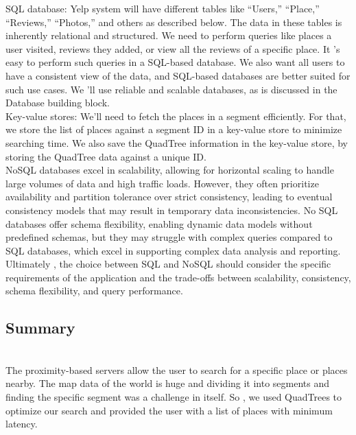 SQL database: Yelp system will have different tables like ``Users,'' ``Place,'' ``Reviews,'' ``Photos,'' and others as described below. The data in these tables is inherently relational and structured. We need to perform queries like places a user visited, reviews they added, or view all the reviews of a specific place. It 's easy to perform such queries in a SQL-based database. We also want all users to have a consistent view of the data, and SQL-based databases are better suited for such use cases. We
'll use reliable and scalable databases, as is discussed in the Database building block.
\\
Key-value stores: We'll need to fetch the places in a segment efficiently. For that, we store the list of places against a segment ID in a key-value store to minimize searching time. We also save the QuadTree information in the key-value store, by storing the QuadTree data against a unique ID.
\\
NoSQL databases excel in scalability, allowing for horizontal scaling to handle large volumes of data and high traffic loads. However, they often prioritize availability and partition tolerance over strict consistency, leading to eventual consistency models that may result in temporary data inconsistencies. No SQL databases offer schema flexibility, enabling dynamic data models without predefined schemas, but they may struggle with complex queries compared to SQL databases, which excel in supporting complex data analysis and reporting. Ultimately
, the choice between SQL and NoSQL should consider the specific requirements of the application and the trade-offs between scalability, consistency, schema flexibility, and query performance.

\subsection{Summary}\label{e6L3XN3URCeSjwSeu98Dn}
\\
The proximity-based servers allow the user to search for a specific place or places nearby. The map data of the world is huge and dividing it into segments and finding the specific segment was a challenge in itself. So , we used QuadTrees to optimize our search and provided the user with a list of places with minimum latency.

